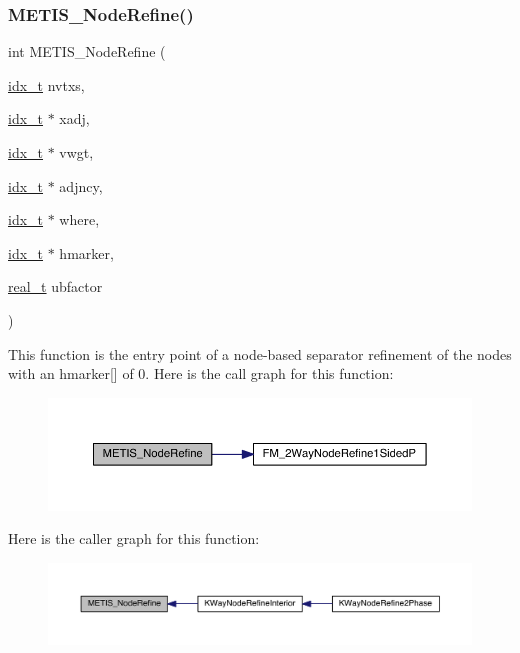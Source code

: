 \subsubsection{\texorpdfstring{M\+E\+T\+I\+S\+\_\+\+Node\+Refine()}{METIS\_NodeRefine()}}
{\footnotesize\ttfamily int M\+E\+T\+I\+S\+\_\+\+Node\+Refine (\begin{DoxyParamCaption}\item[{\hyperlink{a00876_aaa5262be3e700770163401acb0150f52}{idx\+\_\+t}}]{nvtxs,  }\item[{\hyperlink{a00876_aaa5262be3e700770163401acb0150f52}{idx\+\_\+t} $\ast$}]{xadj,  }\item[{\hyperlink{a00876_aaa5262be3e700770163401acb0150f52}{idx\+\_\+t} $\ast$}]{vwgt,  }\item[{\hyperlink{a00876_aaa5262be3e700770163401acb0150f52}{idx\+\_\+t} $\ast$}]{adjncy,  }\item[{\hyperlink{a00876_aaa5262be3e700770163401acb0150f52}{idx\+\_\+t} $\ast$}]{where,  }\item[{\hyperlink{a00876_aaa5262be3e700770163401acb0150f52}{idx\+\_\+t} $\ast$}]{hmarker,  }\item[{\hyperlink{a00876_a1924a4f6907cc3833213aba1f07fcbe9}{real\+\_\+t}}]{ubfactor }\end{DoxyParamCaption})}

This function is the entry point of a node-\/based separator refinement of the nodes with an hmarker\mbox{[}\mbox{]} of 0. Here is the call graph for this function\+:\nopagebreak
\begin{figure}[H]
\begin{center}
\leavevmode
\includegraphics[width=350pt]{a00939_a7181616e1bdb4454ac4a54aab65a4fab_cgraph}
\end{center}
\end{figure}
Here is the caller graph for this function\+:\nopagebreak
\begin{figure}[H]
\begin{center}
\leavevmode
\includegraphics[width=350pt]{a00939_a7181616e1bdb4454ac4a54aab65a4fab_icgraph}
\end{center}
\end{figure}
\mbox{\label{a00939_a55cff7f4deda5d27c8736089a878964c}} 
